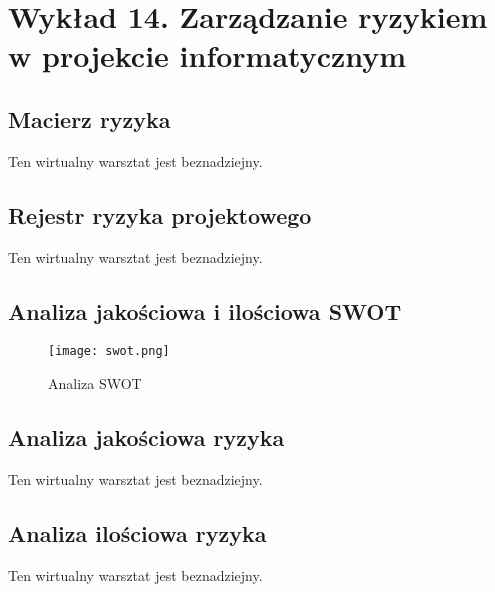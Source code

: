 \chapter{Wykład 14. Zarządzanie ryzykiem w projekcie informatycznym}

\section{Macierz ryzyka}

Ten wirtualny warsztat jest beznadziejny.


\section{Rejestr ryzyka projektowego}

Ten wirtualny warsztat jest beznadziejny.


\section{Analiza jakościowa i ilościowa SWOT}

\begin{figure}[h]
\begin{center}
\texttt{[image: swot.png]}
\caption[Analiza SWOT]{Analiza SWOT}
\label{rysunekProces}
\end{center}
\end{figure}


\section{Analiza jakościowa ryzyka}

Ten wirtualny warsztat jest beznadziejny.


\section{Analiza ilościowa ryzyka}

Ten wirtualny warsztat jest beznadziejny.

